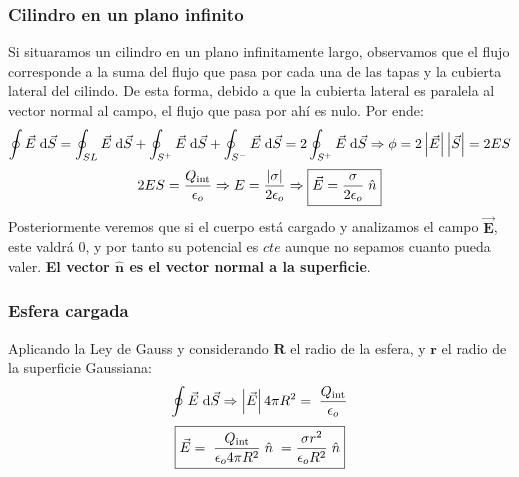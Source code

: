 \subsubsection{Cilindro en un plano infinito}
\noindent Si situaramos un cilindro en un plano infinitamente largo, observamos que el flujo corresponde a la suma del flujo que pasa por cada una de las tapas y la cubierta lateral del cilindo. De esta forma, debido a que la cubierta lateral es paralela al vector normal al campo, el flujo que pasa por ahí es nulo. Por ende:
\[
        \oint \vec{E}\hspace{1mm}\mathrm{d} \vec{S} = \oint_{SL}\vec{E}\hspace{1mm}\mathrm{d} \vec{S} +\oint_{S^+}\vec{E}\hspace{1mm}\mathrm{d} \vec{S}+\oint_{S^-}\vec{E}\hspace{1mm}\mathrm{d} \vec{S} =
        2 \oint_{S^+} \vec{E}\hspace{1mm}\mathrm{d} \vec{S} \Rightarrow \phi =2\left | \vec{E} \right |\left | \vec{S} \right | = 2ES
\]
\[
        2ES = \frac{Q_{\textnormal{int}}}{\epsilon_o} \Rightarrow E = \frac{\left | \sigma \right |}{2\epsilon_o} \Rightarrow \boxed{\vec{E} = \frac{\sigma}{2\epsilon_o}\hspace{1mm}\hat{n}}
\]
Posteriormente veremos que si el cuerpo está cargado y analizamos el campo \(\bm{\vec{E}}\), este valdrá 0, y por tanto su potencial es \(cte\) aunque no sepamos cuanto pueda valer. \textbf{El vector \(\bm{\hat{n}}\) es el vector normal a la superficie}.
\subsubsection{Esfera cargada}
\noindent Aplicando la Ley de Gauss y considerando \(\bm{R}\) el radio de la esfera, y \(\bm{r}\) el radio de la superficie Gaussiana:
\[
        \oint \vec{E} \hspace{1mm} \mathrm{d}\vec{S} \Rightarrow \left | \vec{E} \right | 4\pi R^2 = \hspace{1mm} \frac{Q_{\textnormal{int}}}{\epsilon_o}
\]
\[
        \boxed{\vec{E}  = \hspace{1mm} \frac{Q_{\textnormal{int}}}{\epsilon_o4\pi R^2} \hspace{1mm}\hat{n} \hspace{1mm} = \frac{\sigma r^2}{\epsilon_o R^2} \hspace{1mm}\hat{n}}
\]

